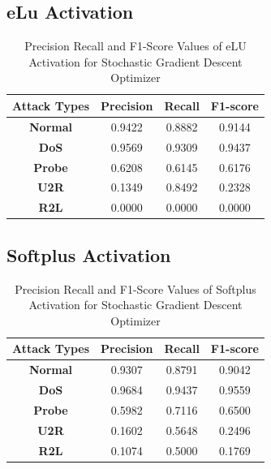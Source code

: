 \documentclass[12pt, a4paper]{report}
\begin{document}
\begin{appendices}
	\subsection{eLu Activation}
 	  \begin{table}[h]
		\centering
		\captionsetup{justification=centering,margin=2cm}
		\begin{tabular}{|c|c|c|c|}
		\hline
		\textbf{Attack Types} & \textbf{Precision} & \textbf{Recall} & \textbf{F1-score} \\ \hline
		\textbf{Normal}       & 0.9422             & 0.8882          & 0.9144            \\ \hline
		\textbf{DoS}          & 0.9569             & 0.9309          & 0.9437            \\ \hline
		\textbf{Probe}        & 0.6208             & 0.6145          & 0.6176            \\ \hline
		\textbf{U2R}          & 0.1349             & 0.8492          & 0.2328            \\ \hline
		\textbf{R2L}          & 0.0000             & 0.0000          & 0.0000            \\ \hline
		\end{tabular}
		\caption{Precision Recall and F1-Score Values of eLU Activation for Stochastic Gradient Descent Optimizer}
		\label{classification elu sgd tflearn}
		\end{table} 
	\clearpage
	\subsection{Softplus Activation}
 	  \begin{table}[h]
		\centering
		\captionsetup{justification=centering,margin=2cm}
		\begin{tabular}{|c|c|c|c|}
		\hline
		\textbf{Attack Types} & \textbf{Precision} & \textbf{Recall} & \textbf{F1-score} \\ \hline
		\textbf{Normal}       & 0.9307             & 0.8791          & 0.9042            \\ \hline
		\textbf{DoS}          & 0.9684             & 0.9437          & 0.9559            \\ \hline
		\textbf{Probe}        & 0.5982             & 0.7116          & 0.6500            \\ \hline
		\textbf{U2R}          & 0.1602             & 0.5648          & 0.2496            \\ \hline
		\textbf{R2L}          & 0.1074             & 0.5000          & 0.1769            \\ \hline
		\end{tabular}
		\caption{Precision Recall and F1-Score Values of Softplus Activation for Stochastic Gradient Descent Optimizer}
		\label{classification softplus sgd tflearn}
		\end{table} 
		

\end{appendices}
\end{document}

